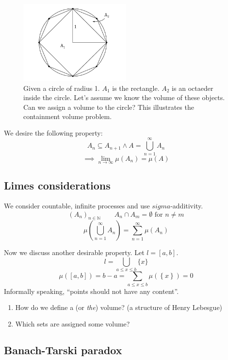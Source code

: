 \documentclass{article}
\newcommand{\set}[1]{\left\{#1\right\}}
\begin{document}
\begin{figure}[h]
  \begin{center}
    \includegraphics[width=0.5\textwidth]{img/12_area.pdf}
    \caption{
      Given a circle of radius 1.
      $A_1$ is the rectangle. $A_2$ is an octaeder inside the circle.
      Let's assume we know the volume of these objects.
      Can we assign a volume to the circle?
      This illustrates the containment volume problem.
    }
  \end{center}
\end{figure}

We desire the following property:
\[ A_n \subseteq A_{n+1} \land A = \bigcup_{n=1}^\infty A_n \]
\[ \implies \lim_{n\to\infty} \mu(A_n) = \mu(A) \]

\subsection{Limes considerations}

We consider countable, infinite processes
and use $sigma$-additivity.
\[ \left(A_n\right)_{n \in \mathbb N} \qquad A_n \cap A_m = \emptyset \text{ for } n \neq m \]
\[ \mu\left(\bigcup_{n=1}^\infty A_n\right) = \sum_{n=1}^\infty \mu(A_n) \]

Now we discuss another desirable property. Let $l = [a,b]$.
\[ l = \bigcup_{a \leq x \leq b} \{x\} \]
\[ \mu([a,b]) = b - a = \sum_{a \leq x \leq b} \mu(\set{x}) = 0 \]
Informally speaking, \enquote{points should not have any content}.

\begin{enumerate}
  \item How do we define a (or \emph{the}) volume?
        (a structure of Henry Lebesgue)
  \item Which sets are assigned some volume?
\end{enumerate}

\subsection{Banach-Tarski paradox}
\end{document}

